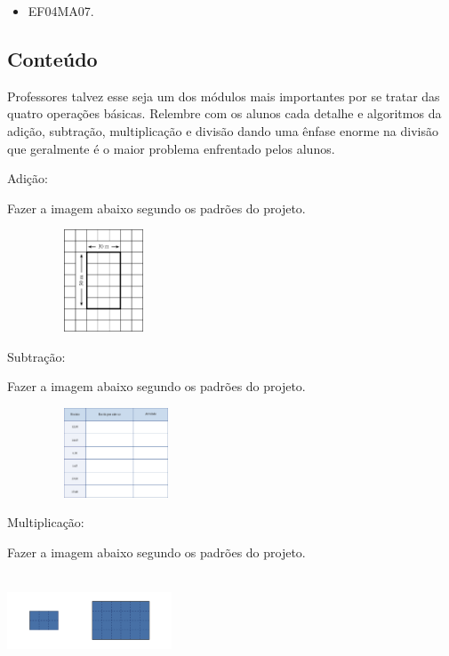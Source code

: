 \begin{enumerate}

\begin{itemize}
\item EF04MA07.
\end{itemize}

\subsection{Conteúdo}\label{conteuxfado-1}

\protect\hypertarget{_Hlk128407586}{}{}Professores talvez esse seja um
dos módulos mais importantes por se tratar das quatro operações básicas.
Relembre com os alunos cada detalhe e algoritmos da adição, subtração,
multiplicação e divisão dando uma ênfase enorme na divisão que
geralmente é o maior problema enfrentado pelos alunos.

Adição:

Fazer a imagem abaixo segundo os padrões do projeto.

\includegraphics[width=2.26282in,height=1.19473in]{media/image27.png}

Subtração:

Fazer a imagem abaixo segundo os padrões do projeto.

\includegraphics[width=2.55128in,height=1.04961in]{media/image28.png}

Multiplicação:

Fazer a imagem abaixo segundo os padrões do projeto.

\includegraphics[width=1.92308in,height=1.09649in]{media/image30.png}


\end{enumerate}
